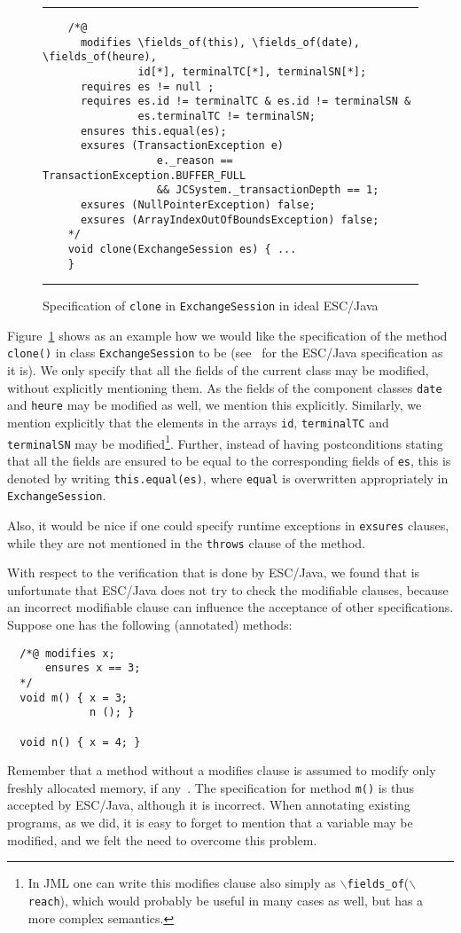 \documentclass[a4paper]{llncs}
\newcommand{\fieldsof}{\(\backslash\)\texttt{fields\_of}}
\newcommand{\reach}{\(\backslash\)\texttt{reach}}
\begin{document}
\begin{figure}[t]
\rule{\linewidth}{0.3mm}
\begin{verbatim}
    /*@
      modifies \fields_of(this), \fields_of(date), \fields_of(heure),
               id[*], terminalTC[*], terminalSN[*];
      requires es != null ;
      requires es.id != terminalTC & es.id != terminalSN &
               es.terminalTC != terminalSN;
      ensures this.equal(es);
      exsures (TransactionException e) 
                  e._reason == TransactionException.BUFFER_FULL 
                  && JCSystem._transactionDepth == 1; 
      exsures (NullPointerException) false;
      exsures (ArrayIndexOutOfBoundsException) false;
    */
    void clone(ExchangeSession es) { ...
    } 
\end{verbatim}
\caption{Specification of \texttt{clone} in \texttt{ExchangeSession}
in ideal ESC/Java}
\label{FigIdealESC}
\rule{\linewidth}{0.3mm}
\end{figure}

Figure~\ref{FigIdealESC} shows as an example how we would like the
specification of the method \texttt{clone()} in class
\texttt{ExchangeSession} to be (see~\cite{CatanoH01Url} for the
ESC/Java specification as it is). We only specify that all the fields
of the current class may be modified, without explicitly mentioning
them. As the fields of the component classes \texttt{date} and
\texttt{heure} may be modified as well, we mention this
explicitly. Similarly, we mention explicitly that the elements in the
arrays \texttt{id}, \texttt{terminalTC} and \texttt{terminalSN} may be
modified\footnote{In JML one can write this modifies clause also
simply as \fieldsof(\reach), which would probably be useful in many
cases as well, but has a more complex semantics.}. Further, instead of
having postconditions stating that all the fields are ensured to be
equal to the corresponding fields of \texttt{es}, this is denoted by
writing \texttt{this.equal(es)}, where \texttt{equal} is overwritten
appropriately in \texttt{ExchangeSession}.

Also, it would be nice if one could specify runtime exceptions in
\texttt{exsures} clauses, while they are not mentioned in the
\texttt{throws} clause of the method.

With respect to the verification that is done by ESC/Java, we found
that is unfortunate that ESC/Java does not try to check the modifiable 
clauses, because an incorrect modifiable clause can influence the 
acceptance of other specifications. Suppose one has the following
(annotated) methods$:$
\begin{verbatim}
  /*@ modifies x;
      ensures x == 3;
  */
  void m() { x = 3;
             n (); }

  void n() { x = 4; }
\end{verbatim}
Remember that a method without a modifies clause is assumed to modify
only freshly allocated memory, if any~\cite{LeinoNS00}. The
specification for method \texttt{m()} is thus accepted by ESC/Java,
although it is incorrect. When annotating existing programs, as we
did, it is easy to forget to mention that a variable may be modified,
and we felt the need to overcome this problem.
\end{document}
